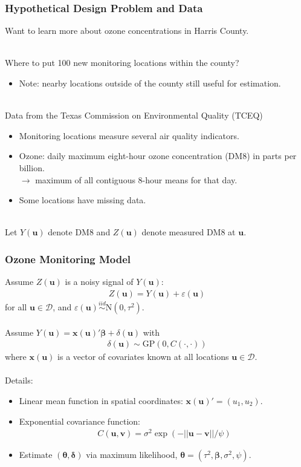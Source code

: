 \documentclass[xcolor=dvipsnames]{beamer}
\begin{document}
\begin{frame}
  \frametitle{Hypothetical Design Problem and Data}
  Want to learn more about ozone concentrations in Harris County.\\~

  Where to put 100 new monitoring locations within the county? \\
  \begin{itemize}
  \item[] Note: nearby locations outside of the county still useful for estimation.\\~\\
  \end{itemize}\pause

  Data from the Texas Commission on Environmental Quality (TCEQ)
  \begin{itemize}
  \item Monitoring locations measure several air quality indicators.
  \item Ozone: daily maximum eight-hour ozone concentration (DM8) in parts per billion.\\
    $\to$ maximum of all contiguous 8-hour means for that day.
  \item Some locations have missing data.\\~\pause 
  \end{itemize}

  Let $Y(\bm{u})$ denote DM8 and $Z(\bm{u})$ denote measured DM8 at $\bm{u}$.
\end{frame}



\begin{frame}
\frametitle{Ozone Monitoring Model}
Assume $Z(\bm{u})$ is a noisy signal of $Y(\bm{u})$:
\begin{align*}
Z(\bm{u}) = Y(\bm{u}) + \varepsilon(\bm{u})
\end{align*}
for all $\bm{u}\in\mathcal{D}$, and $\varepsilon(\bm{u}) \stackrel{iid}{\sim} \mathrm{N}(0, \tau^2)$. \pause\\~\\

Assume $Y(\bm{u}) = \bm{x}(\bm{u})'\bm{\beta} + \delta(\bm{u})$ with
\begin{align*}
\delta(\bm{u}) \sim \mathrm{GP}(0, C(\cdot, \cdot))
\end{align*}
where $\bm{x}(\bm{u})$ is a vector of covariates known at all locations $\bm{u}\in\mathcal{D}$.\pause \\~\\ 

Details:
\begin{itemize}
\item Linear mean function in spatial coordinates: $\bm{x}(\bm{u})' = (u_1, u_2)$.
\item Exponential covariance function:
  \begin{align*}
    C(\bm{u},\bm{v}) = \sigma^2\exp(-||\bm{u} - \bm{v}||/\psi)
  \end{align*}
\item Estimate $(\bm{\theta}, \bm{\delta})$ via maximum likelihood, $\bm{\theta} = (\tau^2, \bm{\beta}, \sigma^2, \psi)$.
\end{itemize}
\end{frame}
\end{document}
